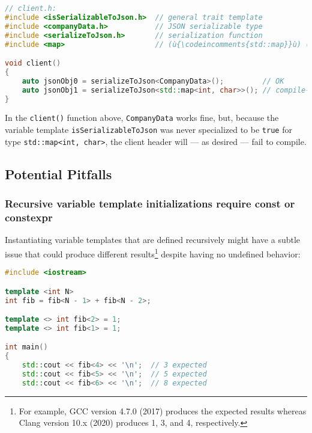 {\begin{lstlisting}[language=C++]
// client.h:
#include <isSerializableToJson.h>  // general trait template
#include <companyData.h>           // JSON serializable type
#include <serializeToJson.h>       // serialization function
#include <map>                     // (ù{\codeincomments{std::map}}ù) (not JSON serializable)

void client()
{
    auto jsonObj0 = serializeToJson<CompanyData>();         // OK
    auto jsonObj1 = serializeToJson<std::map<int, char>>(); // compile-time error
}
\end{lstlisting}

\noindent In the \texttt{client()} function above, \texttt{CompanyData} works
fine, but, because the variable template \texttt{isSerializableToJson}
was never specialized to be \texttt{true} for type
\mbox{\texttt{std::map<int,} \texttt{char>}}, the client header will --- as
desired --- fail to compile.

\subsection[Potential Pitfalls]{Potential Pitfalls}\label{variabletemplate-potential-pitfalls}

\subsubsection[Recursive variable template initializations require {\tt const} or {\tt constexpr}]{Recursive variable template initializations require {\SubsubsecCode const} or {\SubsubsecCode constexpr}}\label{recursive-variable-template-initializations-require-const-or-constexpr}

Instantiating variable templates that are defined recursively might have a subtle issue that could produce different results{\cprotect\footnote{For
example, GCC version 4.7.0 (2017) produces the expected results whereas
  Clang version 10.x (2020) produces 1, 3, and 4, respectively.}} despite having no undefined behavior:

\begin{lstlisting}[language=C++]
#include <iostream>

template <int N>
int fib = fib<N - 1> + fib<N - 2>;

template <> int fib<2> = 1;
template <> int fib<1> = 1;

int main()
{
    std::cout << fib<4> << '\n';  // 3 expected
    std::cout << fib<5> << '\n';  // 5 expected
    std::cout << fib<6> << '\n';  // 8 expected


\end{lstlisting}}
